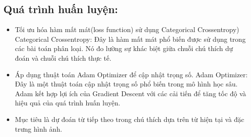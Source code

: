 \documentclass{article}
\begin{document}
\subsection{Quá trình huấn luyện:}
\begin{itemize}
    \item Tối ưu hóa hàm mất mát(loss function) sử dụng Categorical Crossentropy)
    Categorical Crossentropy: Đây là hàm mất mát phổ biến được sử dụng trong các bài toán phân loại. Nó đo lường sự khác biệt giữa chuỗi chú thích dự đoán và chuỗi chú thích thực tế.
    \item Áp dụng thuật toán Adam Optimizer để cập nhật trọng số.
    Adam Optimizer: Đây là một thuật toán cập nhật trọng số phổ biến trong mô hình học sâu. Adam kết hợp lợi ích của Gradient Descent với các cải tiến để tăng tốc độ và hiệu quả của quá trình huấn luyện.
    \item Mục tiêu là dự đoán từ tiếp theo trong chú thích dựa trên từ hiện tại và đặc trưng hình ảnh.
\end{itemize}
\end{document}
